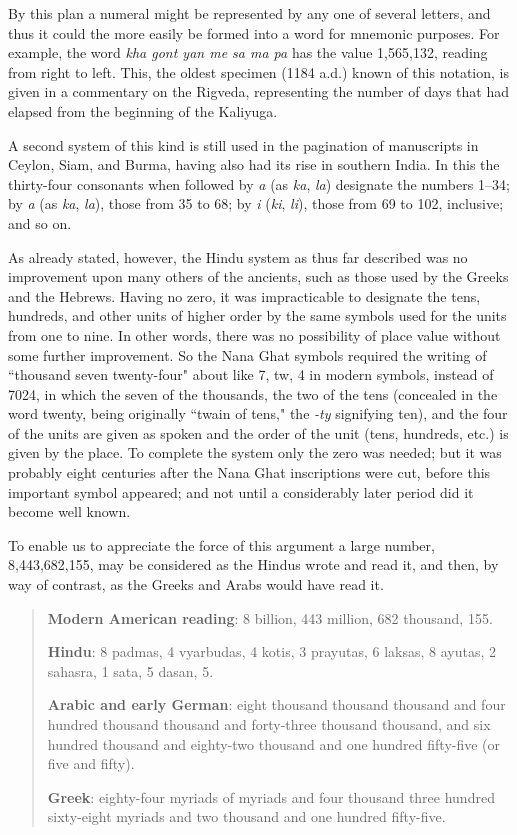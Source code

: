 \documentclass[11pt,a4paper]{article}
\begin{document}
By this plan a numeral might be represented by any one of several letters, and thus it could the more easily be formed into a word for mnemonic purposes. For example, the word \textit{kha gont yan me sa ma pa} has the value 1,565,132, reading from right to left. This, the oldest specimen (1184 a.d.) known of this notation, is given in a commentary on the Rigveda, representing the number of days that had elapsed from the beginning of the Kaliyuga.

A second system of this kind is still used in the pagination of manuscripts in Ceylon, Siam, and Burma, having also had its rise in southern India. In this the thirty-four consonants when followed by \textit{a} (as \textit{ka}, \textit{la}) designate the numbers 1--34; by \textit{a} (as \textit{ka}, \textit{la}), those from 35 to 68; by \textit{i} (\textit{ki}, \textit{li}), those from 69 to 102, inclusive; and so on.

As already stated, however, the Hindu system as thus far described was no improvement upon many others of the ancients, such as those used by the Greeks and the Hebrews. Having no zero, it was impracticable to designate the tens, hundreds, and other units of higher order by the same symbols used for the units from one to nine. In other words, there was no possibility of place value without some further improvement. So the Nana Ghat symbols required the writing of ``thousand seven twenty-four" about like 7, tw, 4 in modern symbols, instead of 7024, in which the seven of the thousands, the two of the tens (concealed in the word twenty, being originally ``twain of tens," the \textit{-ty} signifying ten), and the four of the units are given as spoken and the order of the unit (tens, hundreds, etc.) is given by the place. To complete the system only the zero was needed; but it was probably eight centuries after the Nana Ghat inscriptions were cut, before this important symbol appeared; and not until a considerably later period did it become well known.

To enable us to appreciate the force of this argument a large number, 8,443,682,155, may be considered as the Hindus wrote and read it, and then, by way of contrast, as the Greeks and Arabs would have read it.

\begin{quote}
\textbf{Modern American reading}: 8 billion, 443 million, 682 thousand, 155.

\smallskip
\textbf{Hindu}: 8 padmas, 4 vyarbudas, 4 kotis, 3 prayutas, 6 laksas, 8 ayutas, 2 sahasra, 1 sata, 5 dasan, 5.

\smallskip
\textbf{Arabic and early German}: eight thousand thousand thousand and four hundred thousand thousand and forty-three thousand thousand, and six hundred thousand and eighty-two thousand and one hundred fifty-five (or five and fifty).

\smallskip
\textbf{Greek}: eighty-four myriads of myriads and four thousand three hundred sixty-eight myriads and two thousand and one hundred fifty-five.
\end{quote}
\end{document}
